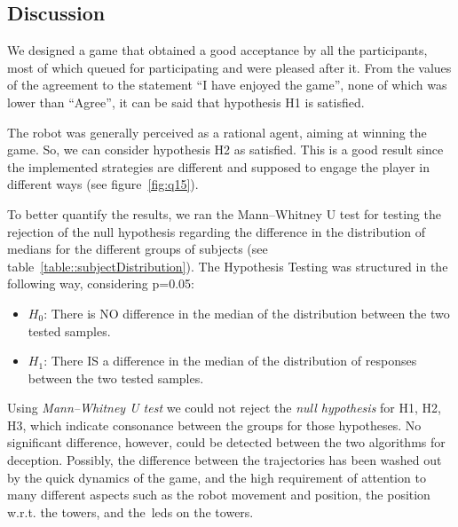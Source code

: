 \subsection{Discussion}\label{sec:deception_discussion}
We designed a game that obtained a good acceptance by all the participants, most of which queued for participating and were pleased after it. From the values of the agreement to the statement ``I have enjoyed the game'', none of which was lower than ``Agree'', it can be said that hypothesis H1 is satisfied.  

The robot was generally perceived as a rational agent, aiming at winning the game. So, we can consider hypothesis H2 as satisfied. This is a good result since the implemented strategies are different and supposed to engage the player in different ways (see figure~\ref{fig:q15}).

To better quantify the results, we ran the Mann–Whitney U test for testing the rejection of the null hypothesis regarding the difference in the distribution of medians for the different groups of subjects (see table~\ref{table::subjectDistribution}). The Hypothesis Testing was structured in the following way, considering p=0.05:

\begin{itemize}
    \item $H_{0}$: There is NO difference in the median of the distribution between the two tested samples.
    \item $H_{1}$: There IS a difference in the median of the distribution of responses between the two tested samples.
\end{itemize}

Using \textit{Mann–Whitney U test} we could not reject the \textit{null hypothesis} for H1, H2, H3, which indicate consonance between the groups for those hypotheses. No significant difference, however, could be detected between the two algorithms for deception. Possibly, the difference between the trajectories has been washed out by the quick dynamics of the game, and the high requirement of attention to many different aspects such as the robot movement and position, the position w.r.t. the towers, and the~\gls{led}s on the towers. 

